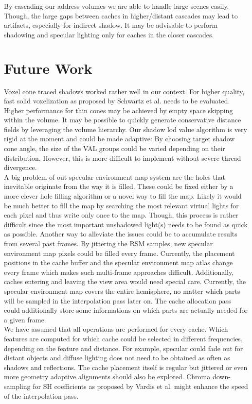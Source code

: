 \documentclass[thesis.tex]{subfiles}
\begin{document}
By cascading our address volumes we are able to handle large scenes easily.
Though, the large gaps between caches in higher/distant cascades may lead to artifacts, especially for indirect shadow.
It may be advisable to perform shadowing and specular lighting only for caches in the closer cascades.



\section{Future Work}
Voxel cone traced shadows worked rather well in our context.
For higher quality, fast solid voxelization as proposed by Schwartz et al. \cite{bib:solidvoxelization} needs to be evaluated.
Higher performance for thin cones may be achieved by empty space skipping within the volume.
It may be possible to quickly generate conservative distance fields by leveraging the volume hierarchy.
%
Our shadow lod value algorithm is very rigid at the moment and could be made adaptive:
By choosing target shadow cone angle, the size of the VAL groups could be varied depending on their distribution.
However, this is more difficult to implement without severe thread divergence.
%
\\
A big problem of out specular environment map system are the holes that inevitable originate from the way it is filled.
These could be fixed either by a more clever hole filling algorithm or a novel way to fill the map.
Likely it would be much better to fill the map by searching the most relevant virtual lights for each pixel and thus write only once to the map.
Though, this process is rather difficult since the most important unshadowed light(s) needs to be found as quick as possible.
%
Another way to alleviate the issues could be to accumulate results from several past frames.
By jittering the RSM samples, new specular environment map pixels could be filled every frame.
Currently, the placement positions in the cache buffer and the specular environment map atlas change every frame which makes such multi-frame approaches difficult.
Additionally, caches entering and leaving the view area would need special care.
%
Currently, the specular environment map covers the entire hemisphere, no matter which parts will be sampled in the interpolation pass later on.
The cache allocation pass could additionally store some informations on which parts are actually needed for a given frame.
\\
We have assumed that all operations are performed for every cache.
Which features are computed for which cache could be selected in different frequencies, depending on the feature and distance.
For example, specular could fade out for distant objects and diffuse lighting does not need to be obtained as often as shadows and reflections.
%
The cache placement itself is regular but jittered or even more geometry adaptive alignments should also be explored.
%
Chroma down-sampling for SH coefficients as proposed by Vardis et al. \cite{bib:radiancecachechromaticcompression} might enhance the speed of the interpolation pass.
\end{document}
